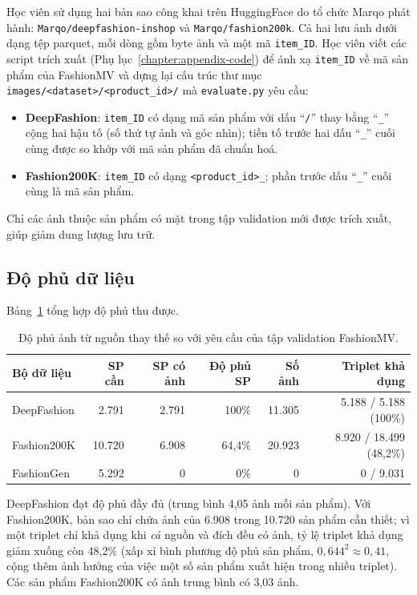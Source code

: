 Học viên sử dụng hai bản sao công khai trên HuggingFace do tổ chức Marqo phát hành: \texttt{Marqo/deepfashion-inshop} và \texttt{Marqo/fashion200k}. Cả hai lưu ảnh dưới dạng tệp parquet, mỗi dòng gồm byte ảnh và một mã \texttt{item\_ID}. Học viên viết các script trích xuất (Phụ lục~\ref{chapter:appendix-code}) để ánh xạ \texttt{item\_ID} về mã sản phẩm của FashionMV và dựng lại cấu trúc thư mục \texttt{images/<dataset>/<product\_id>/} mà \texttt{evaluate.py} yêu cầu:
\begin{itemize}
    \item \textbf{DeepFashion}: \texttt{item\_ID} có dạng mã sản phẩm với dấu ``\texttt{/}'' thay bằng ``\texttt{\_}'' cộng hai hậu tố (số thứ tự ảnh và góc nhìn); tiền tố trước hai dấu ``\texttt{\_}'' cuối cùng được so khớp với mã sản phẩm đã chuẩn hoá.
    \item \textbf{Fashion200K}: \texttt{item\_ID} có dạng \texttt{<product\_id>\_<chỉ số ảnh>}; phần trước dấu ``\texttt{\_}'' cuối cùng là mã sản phẩm.
\end{itemize}
Chỉ các ảnh thuộc sản phẩm có mặt trong tập validation mới được trích xuất, giúp giảm dung lượng lưu trữ.

\subsection{Độ phủ dữ liệu}

Bảng~\ref{tab:coverage} tổng hợp độ phủ thu được.

\begin{table}[h]
\centering
\caption{Độ phủ ảnh từ nguồn thay thế so với yêu cầu của tập validation FashionMV.}
\label{tab:coverage}
\begin{tabular}{lrrrrr}
\toprule
Bộ dữ liệu & SP cần & SP có ảnh & Độ phủ SP & Số ảnh & Triplet khả dụng \\
\midrule
DeepFashion & 2.791  & 2.791 & 100\%  & 11.305 & 5.188 / 5.188 (100\%) \\
Fashion200K & 10.720 & 6.908 & 64,4\% & 20.923 & 8.920 / 18.499 (48,2\%) \\
FashionGen  & 5.292  & 0     & 0\%    & 0      & 0 / 9.031 \\
\bottomrule
\end{tabular}
\end{table}

DeepFashion đạt độ phủ đầy đủ (trung bình 4,05 ảnh mỗi sản phẩm). Với Fashion200K, bản sao chỉ chứa ảnh của 6.908 trong 10.720 sản phẩm cần thiết; vì một triplet chỉ khả dụng khi \emph{cả} nguồn và đích đều có ảnh, tỷ lệ triplet khả dụng giảm xuống còn 48,2\% (xấp xỉ bình phương độ phủ sản phẩm, $0{,}644^2 \approx 0{,}41$, cộng thêm ảnh hưởng của việc một số sản phẩm xuất hiện trong nhiều triplet). Các sản phẩm Fashion200K có ảnh trung bình có 3,03 ảnh.

